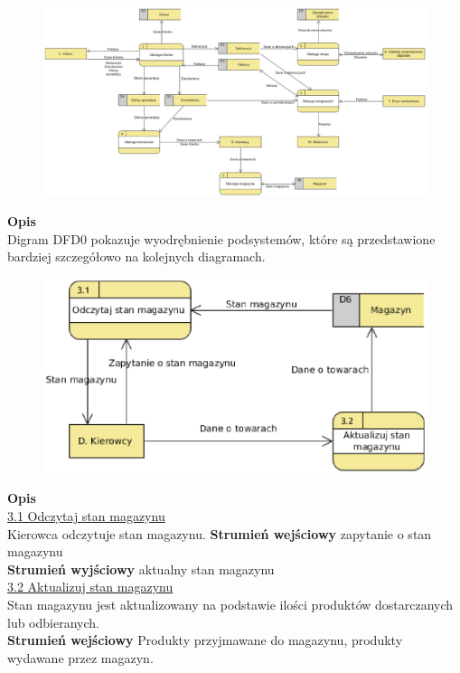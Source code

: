 \linespread{1.6}
\begin{figure}[H]
	\centering
	\includegraphics[width=\textwidth]{img/DFD0.eps}
\end{figure}

\textbf{Opis}\\
Digram DFD0 pokazuje wyodrębnienie podsystemów, które są przedstawione bardziej szczegółowo na kolejnych diagramach.


\begin{figure}[H]
	\centering
	\includegraphics[width=\textwidth]{img/DFD3.eps}
\end{figure}

\textbf{Opis} \\
\underline{3.1 Odczytaj stan magazynu}\\
Kierowca odczytuje stan magazynu.
\textbf{Strumień wejściowy} zapytanie o stan magazynu\\
\textbf{Strumień wyjściowy} aktualny stan magazynu\\
\underline{3.2 Aktualizuj stan magazynu}\\ 
Stan magazynu jest aktualizowany na podstawie ilości produktów dostarczanych lub odbieranych.\\	
\textbf{Strumień wejściowy} Produkty przyjmawane do magazynu, produkty wydawane przez magazyn.
